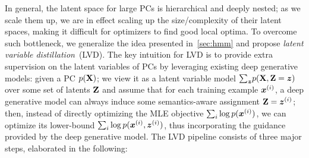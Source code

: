 \documentclass{article} %
\begin{document}
In general, the latent space for large PCs is hierarchical and deeply nested; as we scale them up, we are in effect scaling up the size/complexity of their latent spaces, making it difficult for optimizers to find good local optima. To overcome such bottleneck, we generalize the idea presented in~\cref{sec:hmm} and propose \emph{latent variable distillation}~(LVD). The key intuition for LVD is to provide extra supervision on the latent variables of PCs by leveraging existing deep generative models: given a PC ${p}(\mathbf{X})$; we view it as a latent variable model ${\sum}_{\boldsymbol{z}}{p}(\mathbf{X}, \mathbf{Z}=\boldsymbol{z})$ over some set of latents $\mathbf{Z}$ and assume that for each training example $\boldsymbol{x}^{(i)}$, a deep generative model can always induce some semantics-aware assignment $\mathbf{Z}=\boldsymbol{z}^{(i)}$; then, instead of directly optimizing the MLE objective ${\sum}_{i}\log{p}(\boldsymbol{x}^{(i)})$, we can optimize its lower-bound ${\sum}_{i}\log{p}(\boldsymbol{x}^{(i)}, \boldsymbol{z}^{(i)})$, thus incorporating the guidance provided by the deep generative model. The LVD pipeline consists of three major steps, elaborated in the following:


\end{document}

